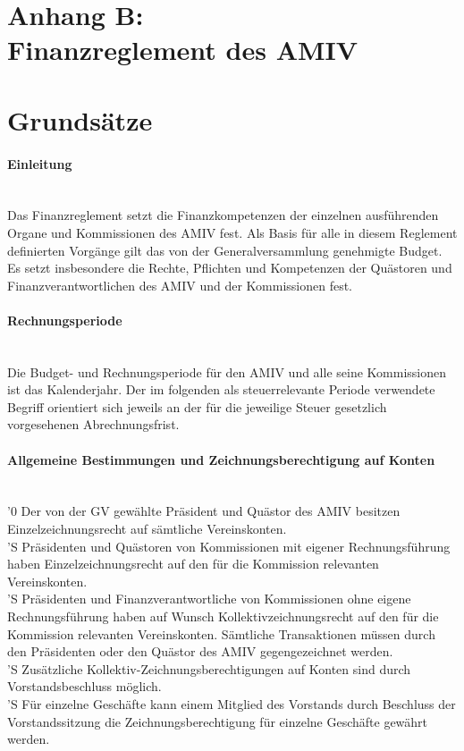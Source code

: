 \documentclass[a4paper,11pt]{article}
\newcommand{\nl}{\\[1.5ex]}
\begin{document}


\newpage
\section*{Anhang B:\\ Finanzreglement des AMIV}
\section*{Grundsätze}
\paragraph{Einleitung} \ \\
Das Finanzreglement setzt die Finanzkompetenzen der einzelnen ausführenden Organe und Kommissionen des AMIV fest. Als Basis für alle in diesem Reglement definierten Vorgänge gilt das von der Generalversammlung genehmigte Budget. Es setzt insbesondere die Rechte, Pflichten und Kompetenzen der Quästoren und Finanzverantwortlichen des AMIV und der Kommissionen fest.


\paragraph{Rechnungsperiode} \ \\
Die Budget- und Rechnungsperiode für den AMIV und alle seine Kommissionen ist das Kalenderjahr. Der im folgenden als steuerrelevante Periode verwendete Begriff orientiert sich jeweils an der für die jeweilige Steuer gesetzlich vorgesehenen Abrechnungsfrist.


\paragraph{Allgemeine Bestimmungen und Zeichnungsberechtigung auf Konten} \ \\
'0 Der von der GV gewählte Präsident und Quästor des AMIV besitzen Einzelzeichnungsrecht auf sämtliche Vereinskonten.\nl
'S Präsidenten und Quästoren von Kommissionen mit eigener Rechnungsführung haben Einzelzeichnungsrecht auf den für die Kommission relevanten Vereinskonten.\nl
'S Präsidenten und Finanzverantwortliche von Kommissionen ohne eigene Rechnungsführung haben auf Wunsch Kollektivzeichnungsrecht auf den für die Kommission relevanten Vereinskonten. Sämtliche Transaktionen müssen durch den Präsidenten oder den Quästor des AMIV gegengezeichnet werden.\nl
'S Zusätzliche Kollektiv-Zeichnungsberechtigungen auf Konten sind durch Vorstandsbeschluss möglich.\nl
'S Für einzelne Geschäfte kann einem Mitglied des Vorstands durch Beschluss der Vorstandssitzung die Zeichnungsberechtigung für einzelne Geschäfte gewährt werden.
\end{document}
